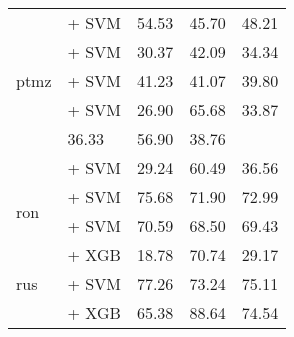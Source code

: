 \begin{table*}[ht]
\begin{tabular}{@{}llp{1.1cm}p{1.1cm}p{1.1cm}@{}}
        \multirow{5}{*}{ptmz}              & \citep{wang2024multilingual} + SVM                                 & 54.53                           & 45.70                              & 48.21                             \\
                                           & \citep{filho2023bertportuguesenliassin2} + SVM                     & 30.37                           & 42.09                              & 34.34                             \\
                                           & \citep{souza2020bertimbau} + SVM                                   & 41.23                           & 41.07                              & 39.80                             \\
                                           & \citep{melo2023bertlargeportuguesests} + SVM                       & 26.90                           & 65.68                              & 33.87                             \\                                       & 36.33                                & 56.90              & 38.76             \\
                                           & \citep{sturua2024jinaembeddingsv3multilingualembeddingstask} + SVM & 29.24                           & 60.49                              & 36.56                             \\
        \midrule
        \multirow{2}{*}{ron}               & \citep{wang2024multilingual} + SVM                                 & 75.68                           & 71.90                              & 72.99                             \\
                                           & \citep{sturua2024jinaembeddingsv3multilingualembeddingstask} + SVM & 70.59                           & 68.50                              & 69.43                             \\
        \midrule
        \multirow{3}{*}{rus}               & \citep{all-MiniLM-L12-v2} + XGB                                    & 18.78                           & 70.74                              & 29.17                             \\
                                           & \citep{wang2024multilingual} + SVM                                 & 77.26                           & 73.24                              & 75.11                             \\
                                           & \citep{snegirev2025russianfocusedembeddersexplorationrumteb} + XGB & 65.38                           & 88.64                              & 74.54                             \\

\end{tabular}
\end{table*}
